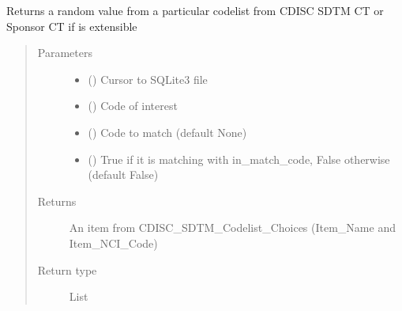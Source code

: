 \documentclass[letterpaper,10pt,english]{sphinxmanual}
\begin{document}
\begin{fulllineitems}
\label{\detokenize{CE_app:CE_app.nihpo_functions.func_nihpo_synth_data_random_value}}
\sphinxAtStartPar
Returns a random value from a particular codelist from CDISC SDTM CT or Sponsor CT if is extensible
\begin{quote}\begin{description}
\item[{Parameters}] \leavevmode\begin{itemize}
\item {} 
\sphinxAtStartPar
{} () \textendash{} Cursor to SQLite3 file

\item {} 
\sphinxAtStartPar
{} () \textendash{} Code of interest

\item {} 
\sphinxAtStartPar
{} () \textendash{} Code to match (default None)

\item {} 
\sphinxAtStartPar
{} () \textendash{} True if it is matching with in\_match\_code, False otherwise (default False)

\end{itemize}

\item[{Returns}] \leavevmode
\sphinxAtStartPar
An item from CDISC\_SDTM\_Codelist\_Choices (Item\_Name and Item\_NCI\_Code)

\item[{Return type}] \leavevmode
\sphinxAtStartPar
List

\end{description}\end{quote}

\end{fulllineitems}
\end{document}
